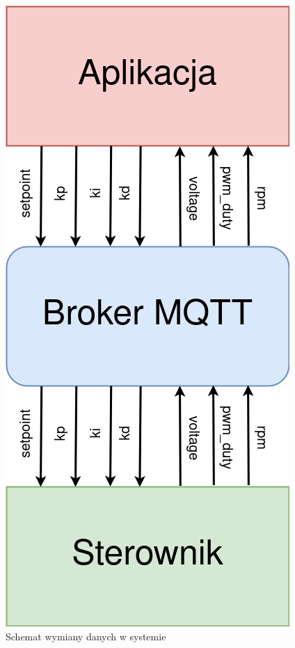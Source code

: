    
        \begin{figure}[ht]
          \centering
          \includegraphics[height=0.8\textheight]{img/dane.png}
          \caption{Schemat wymiany danych w systemie}
          \label{data_transmision}
        \end{figure}